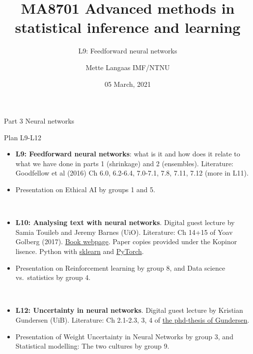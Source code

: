 \documentclass[
  ignorenonframetext,
]{beamer}
\title{MA8701 Advanced methods in statistical inference and learning}
\subtitle{L9: Feedforward neural networks}
\author{Mette Langaas IMF/NTNU}
\date{05 March, 2021}
\begin{document}
\frame{\titlepage}

\begin{frame}{Part 3 Neural networks}
\protect\hypertarget{part-3-neural-networks}{}
\begin{block}{Plan L9-L12}
\protect\hypertarget{plan-l9-l12}{}
\(~\)

\begin{itemize}
\item
  \textbf{L9: Feedforward neural networks}: what is it and how does it
  relate to what we have done in parts 1 (shrinkage) and 2 (ensembles).
  Literature: Goodfellow et al (2016) Ch 6.0, 6.2-6.4, 7.0-7.1, 7.8,
  7.11, 7.12 (more in L11).
\item
  Presentation on Ethical AI by groups 1 and 5.
\end{itemize}

\(~\)

\begin{itemize}
\item
  \textbf{L10: Analysing text with neural networks}. Digital guest
  lecture by Samia Touileb and Jeremy Barnes (UiO). Literature: Ch 14+15
  of Yoav Golberg (2017).
  \href{https://doi.org/10.2200/S00762ED1V01Y201703HLT037}{Book
  webpage}. Paper copies provided under the Kopinor lisence. Python with
  \href{https://scikit-learn.org/stable/}{sklearn} and
  \href{https://pytorch.org/}{PyTorch}.
\item
  Presentation on Reinforcement learning by group 8, and Data science
  vs.~statistics by group 4.
\end{itemize}
\end{block}
\end{frame}

\begin{frame}
\(~\)

\begin{itemize}
\item
  \textbf{L12: Uncertainty in neural networks}. Digital guest lecture by
  Kristian Gundersen (UiB). Literature: Ch 2.1-2.3, 3, 4 of
  \href{https://bora.uib.no/bora-xmlui/handle/11250/2725235}{the
  phd-thesis of Gundersen}.
\item
  Presentation of Weight Uncertainty in Neural Networks by group 3, and
  Statistical modelling: The two cultures by group 9.
\end{itemize}

\(~\)
\end{frame}
\end{document}
